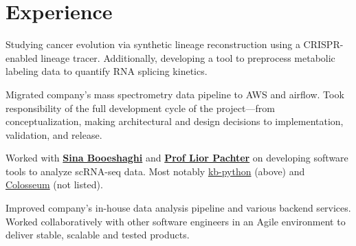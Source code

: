 \documentclass[]{resume}
\begin{document}
\begin{minipage}[t]{0.69\textwidth}

\section{Experience}
Studying cancer evolution via synthetic lineage reconstruction using a CRISPR-enabled lineage tracer. Additionally, developing a tool to preprocess metabolic labeling data to quantify RNA splicing kinetics.
\sectionsep

Migrated company's mass spectrometry data pipeline to AWS and airflow. Took responsibility of the full development cycle of the project---from conceptualization, making architectural and design decisions to implementation, validation, and release.
\sectionsep

Worked with \textbf{\href{https://sinabooeshaghi.com/}{Sina Booeshaghi}} and \textbf{\href{https://pachterlab.github.io/biography.html}{Prof Lior Pachter}} on developing software tools to analyze scRNA-seq data. Most notably \href{https://github.com/pachterlab/kb_python}{kb-python} (above) and \href{https://github.com/pachterlab/colosseum}{Colosseum} (not listed).
\sectionsep

Improved company's in-house data analysis pipeline and various backend services. Worked collaboratively with other software engineers in an Agile environment to deliver stable, scalable and tested products.
\sectionsep


\end{minipage}
\end{document}
